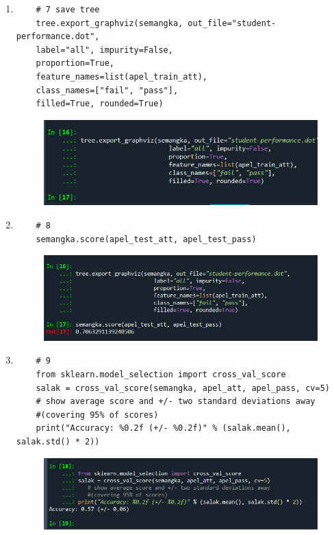 \begin{enumerate}
\begin{figure}[!htbp]
\end{figure}
\item
\begin{verbatim}
	# 7 save tree
	tree.export_graphviz(semangka, out_file="student-performance.dot", 
	label="all", impurity=False, 
	proportion=True,
	feature_names=list(apel_train_att), 
	class_names=["fail", "pass"], 
	filled=True, rounded=True)
\end{verbatim}
\begin{figure}[!htbp]
	\centering
	\includegraphics[scale=0.8]{figures/savetree.PNG}
\end{figure}
\item
\begin{verbatim}
	# 8
	semangka.score(apel_test_att, apel_test_pass)
\end{verbatim}
\begin{figure}[!htbp]
	\centering
	\includegraphics[scale=0.8]{figures/8.PNG}
\end{figure}
\item
\begin{verbatim}
	# 9
	from sklearn.model_selection import cross_val_score
	salak = cross_val_score(semangka, apel_att, apel_pass, cv=5)
	# show average score and +/- two standard deviations away 
	#(covering 95% of scores)
	print("Accuracy: %0.2f (+/- %0.2f)" % (salak.mean(), salak.std() * 2))
\end{verbatim}
\begin{figure}[!htbp]
	\centering
	\includegraphics[scale=0.8]{figures/9.PNG}

\end{figure}
\end{enumerate}
